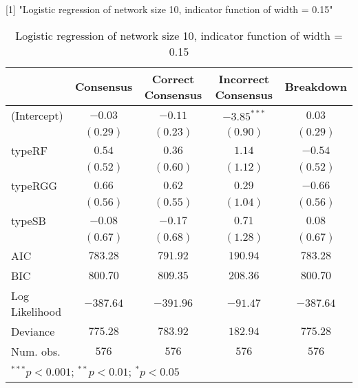 [1] "Logistic regression of network size 10, indicator function of width = 0.15"

\begin{table}
\begin{center}
\begin{tabular}{l c c c c}
\toprule
 & Consensus & Correct Consensus & Incorrect Consensus & Breakdown \\
\midrule
(Intercept)    & $-0.03$   & $-0.11$   & $-3.85^{***}$ & $0.03$    \\
               & $(0.29)$  & $(0.23)$  & $(0.90)$      & $(0.29)$  \\
typeRF         & $0.54$    & $0.36$    & $1.14$        & $-0.54$   \\
               & $(0.52)$  & $(0.60)$  & $(1.12)$      & $(0.52)$  \\
typeRGG        & $0.66$    & $0.62$    & $0.29$        & $-0.66$   \\
               & $(0.56)$  & $(0.55)$  & $(1.04)$      & $(0.56)$  \\
typeSB         & $-0.08$   & $-0.17$   & $0.71$        & $0.08$    \\
               & $(0.67)$  & $(0.68)$  & $(1.28)$      & $(0.67)$  \\
\midrule
AIC            & $783.28$  & $791.92$  & $190.94$      & $783.28$  \\
BIC            & $800.70$  & $809.35$  & $208.36$      & $800.70$  \\
Log Likelihood & $-387.64$ & $-391.96$ & $-91.47$      & $-387.64$ \\
Deviance       & $775.28$  & $783.92$  & $182.94$      & $775.28$  \\
Num. obs.      & $576$     & $576$     & $576$         & $576$     \\
\bottomrule
\multicolumn{5}{l}{\scriptsize{$^{***}p<0.001$; $^{**}p<0.01$; $^{*}p<0.05$}}
\end{tabular}
\caption{Logistic regression of network size 10, indicator function of width = 0.15}
\label{table:coefficients}
\end{center}
\end{table}
